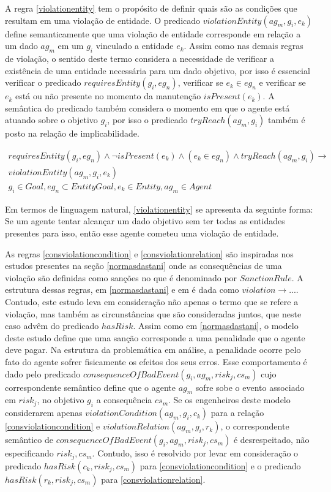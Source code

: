 A regra \ref{violationentity} tem o propósito de definir quais são as condições que resultam em uma violação de entidade. O predicado $violationEntity(ag_m,g_i,e_k)$ define semanticamente que uma violação de entidade corresponde em relação a um dado $ag_m$ em um $g_i$ vinculado a entidade $e_k$. Assim como nas demais regras de violação, o sentido deste termo considera a necessidade de verificar a existência de uma entidade necessária para um dado objetivo, por isso é essencial verificar o predicado $requiresEntity(g_i,eg_n)$, verificar se $e_k \in eg_n$ e verificar se $e_k$ está ou não presente no momento da manutenção $isPresent(e_k)$. A semântica do predicado também considera o momento em que o agente está atuando sobre o objetivo $g_i$, por isso o predicado $tryReach(ag_m,g_i)$ também é posto na relação de implicabilidade.

\begin{eqnarray}\label{violationentity}\nonumber
	requiresEntity(g_i,eg_n) \wedge \neg isPresent(e_k) 	\wedge (e_k \in eg_n) \wedge tryReach(ag_m,g_i) \to \nonumber \\ 
    violationEntity(ag_m,g_i,e_k)  \nonumber \\  
    g_i \in Goal, eg_n \subset EntityGoal, e_k \in Entity, ag_m \in Agent
\end{eqnarray}

Em termos de linguagem natural, \ref{violationentity} se apresenta da seguinte forma: Se um agente tentar alcançar um dado objetivo sem ter todas as entidades presentes para isso, então esse agente cometeu uma violação de entidade.

As regras \ref{consviolationcondition} e \ref{consviolationrelation} são inspiradas nos estudos presentes na seção \ref{normasdastani} onde as consequências de uma violação são definidas como sanções no que é denominado por $Sanction Rule$. A estrutura dessas regras, em \ref{normasdastani} e em \cite{dastaniframework} é dada como $violation \to ... $. Contudo, este estudo leva em consideração não apenas o termo que se refere a violação, mas também as circunstâncias que são consideradas juntos, que neste caso advêm do predicado $hasRisk$. Assim como em \ref{normasdastani}, o modelo deste estudo define que uma sanção corresponde a uma penalidade que o agente deve pagar. Na estrutura da problemática em análise, a penalidade ocorre pelo fato do agente sofrer fisicamente os efeitos dos seus erros. Esse comportamento é dado pelo predicado $consequenceOfBadEvent(g_i,ag_m,risk_j,cs_m)$ cujo correspondente semântico define que o agente $ag_m$ sofre sobe o evento associado em $risk_j$, no objetivo $g_i$ a consequência $cs_m$. Se os engenheiros deste modelo considerarem apenas $violationCondition(ag_m,g_i,c_k)$ para a relação \ref{consviolationcondition} e $violationRelation(ag_m,g_i,r_k)$, o correspondente semântico de $consequenceOfBadEvent(g_i,ag_m,risk_j,cs_m)$ é desrespeitado, não especificando $risk_j,cs_m$. Contudo, isso é resolvido por levar em consideração o predicado $hasRisk(c_k,risk_j,cs_m)$ para \ref{consviolationcondition} e o predicado $hasRisk(r_k,risk_j,cs_m)$ para \ref{consviolationrelation}. 

